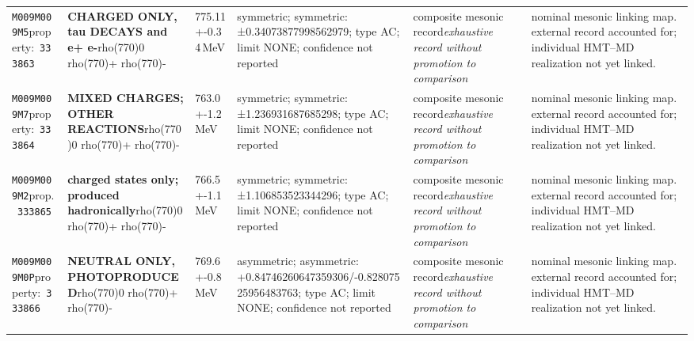 \begin{landscape}
\begin{longtable}{L{1.85cm}L{4.45cm}L{2.35cm}L{4.05cm}L{3.35cm}L{7.15cm}}
\texttt{M009}\newline \texttt{M009M5}\newline property:\ \texttt{333863} & \textbf{CHARGED ONLY, tau DECAYS and e+ e-}\newline rho(770)0 \textbar{}\allowbreak{} rho(770)+ \textbar{}\allowbreak{} rho(770)- & 775.11+-0.34\,MeV & symmetric; symmetric: ±0.34073877998562979; type AC; limit NONE; confidence not reported & composite mesonic record\newline \emph{exhaustive record without promotion to comparison} & nominal mesonic linking map. external record accounted for; individual HMT--MD realization not yet linked. \\
\texttt{M009}\newline \texttt{M009M7}\newline property:\ \texttt{333864} & \textbf{MIXED CHARGES; OTHER REACTIONS}\newline rho(770)0 \textbar{}\allowbreak{} rho(770)+ \textbar{}\allowbreak{} rho(770)- & 763.0+-1.2\,MeV & symmetric; symmetric: ±1.236931687685298; type AC; limit NONE; confidence not reported & composite mesonic record\newline \emph{exhaustive record without promotion to comparison} & nominal mesonic linking map. external record accounted for; individual HMT--MD realization not yet linked. \\
\texttt{M009}\newline \texttt{M009M2}\newline prop.\ \texttt{333865} & \textbf{charged states only; produced hadronically}\newline rho(770)0 \textbar{}\allowbreak{} rho(770)+ \textbar{}\allowbreak{} rho(770)- & 766.5+-1.1\,MeV & symmetric; symmetric: ±1.106853523344296; type AC; limit NONE; confidence not reported & composite mesonic record\newline \emph{exhaustive record without promotion to comparison} & nominal mesonic linking map. external record accounted for; individual HMT--MD realization not yet linked. \\
\texttt{M009}\newline \texttt{M009M0P}\newline property:\ \texttt{333866} & \textbf{NEUTRAL ONLY, PHOTOPRODUCED}\newline rho(770)0 \textbar{}\allowbreak{} rho(770)+ \textbar{}\allowbreak{} rho(770)- & 769.6+-0.8\,MeV & asymmetric; asymmetric: +0.84746260647359306/-0.82807525956483763; type AC; limit NONE; confidence not reported & composite mesonic record\newline \emph{exhaustive record without promotion to comparison} & nominal mesonic linking map. external record accounted for; individual HMT--MD realization not yet linked. \\

\end{longtable}
\end{landscape}
